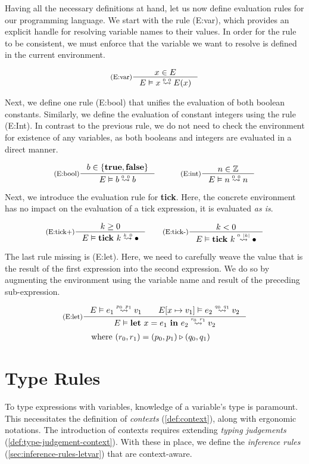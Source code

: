 Having all the necessary definitions at hand, let us now define evaluation rules for our programming language. We start with the rule (E:var), which provides an explicit handle for resolving variable names to their values. In order for the rule to be consistent, we must enforce that the variable we want to resolve is defined in the current environment. 

\[
   \inference[(E:var)]
   {\contains{E}{x}}
   {\evals{E}{x}{E(x)}{0}{0}}
\]

Next, we define one rule (E:bool) that unifies the evaluation of both boolean constants. Similarly, we define the evaluation of constant integers using the rule (E:Int). In contrast to the previous rule, we do not need to check the environment for existence of any variables, as both booleans and integers are evaluated in a direct manner.

\[
   \inference[(E:bool)]{b \in \{\true, \false\}}{\evals{E}{b}{b}{0}{0}}%
   \quad\quad\quad
   \inference[(E:int)]{n \in \mathbb{Z}}{\evals{E}{n}{n}{0}{0}}
\]

Next, we introduce the evaluation rule for \textbf{tick}. Here, the concrete environment has no impact on the evaluation of a tick expression, it is evaluated \emph{as is}. 

\[
   \inference[(E:tick+)]
   {k \geq 0}
   {\evals{E}{\tick{k}}{\bullet}{k}{0}}
   \qquad
   \inference[(E:tick-)]
   {k < 0}
   {\evals{E}{\tick{k}}{\bullet}{0}{|k|}}
\]

The last rule missing is (E:let). Here, we need to carefully weave the value that is the result of the first expression into the second expression. We do so by augmenting the environment using the variable name and result of the preceding sub-expression.

\[
   \inference[(E:let)]
   {\evals{E}{e_1}{v_1}{p_0}{p_1} \qquad \evals{\envaugment{E}{x}{v_1}}{e_2}{v_2}{q_0}{q_1}}
   {\evals{E}{\letexp{x}{e_1}{e_2}}{v_2}{r_0}{r_1}}%
\]
\begin{align*}
   \text{where }  &(r_0, r_1) = (p_0, p_1) \triangleright (q_0, q_1)
\end{align*}


\section{Type Rules}\label{sec:type-rules-5}

To type expressions with variables, knowledge of a variable's type is paramount. This necessitates the definition of \emph{contexts} (\cref{def:context}), along with ergonomic notations. The introduction of contexts requires extending \emph{typing judgements} (\cref{def:type-judgement-context}). With these in place, we define the \emph{inference rules} (\cref{sec:inference-rules-letvar}) that are context-aware.

